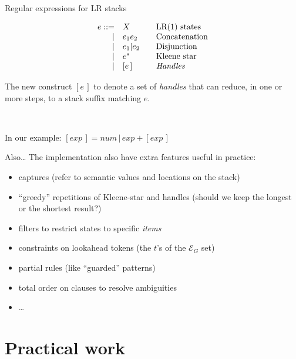 \documentclass[aspectratio=169]{beamer}          %
\begin{document}
\begin{frame}[t]{Regular expressions for LR stacks}

  $$
  \begin{array}{rlll}
    e ::=& X      & & \text{LR(1) states}\\
    | & e_1 e_2   & & \text{Concatenation}\\
    | & e_1 | e_2 & & \text{Disjunction}\\
    | & e^*       & & \text{Kleene star}\\
    | & [e\,]     & & \text{{\em Handles}}
  \end{array}
  $$

  \pause
  \vspace{1cm}
  The new construct $[e\,]$ to denote a set of {\em handles}
  that can reduce, in one or more steps, to a stack suffix matching $e$.

    \

  \pause
  In our example:
  $[exp\,] = num\,\big|\,exp + [exp\,]$
\end{frame}

\begin{frame}{Also\ldots}
  The implementation also have extra features useful in practice:
  \begin{itemize}
    \item captures (refer to semantic values and locations on the stack)
    \item ``greedy'' repetitions of Kleene-star and handles (should we keep the longest or the shortest result?)
    \item filters to restrict states to specific {\em items}
    \item constraints on lookahead tokens (the $t$'s of the $\mathcal E_G$ set)
    \item partial rules (like ``guarded'' patterns)
    \item total order on clauses to resolve ambiguities
    \item \ldots
  \end{itemize}

\end{frame}

\section{Practical work}
\end{document}
